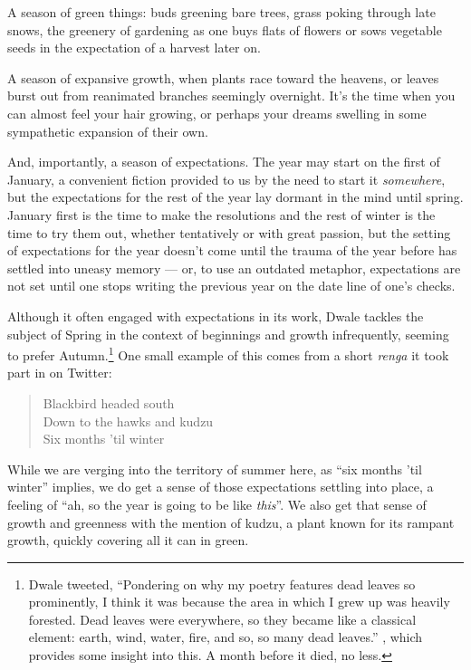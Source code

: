 \documentclass[12pt,oneside]{memoir}
\begin{document}
A season of green things: buds greening bare trees, grass poking through late snows, the greenery of gardening as one buys flats of flowers or sows vegetable seeds in the expectation of a harvest later on.

A season of expansive growth, when plants race toward the heavens, or leaves burst out from reanimated branches seemingly overnight. It's the time when you can almost feel your hair growing, or perhaps your dreams swelling in some sympathetic expansion of their own.

And, importantly, a season of expectations. The year may start on the first of January, a convenient fiction provided to us by the need to start it \emph{somewhere}, but the expectations for the rest of the year lay dormant in the mind until spring. January first is the time to make the resolutions and the rest of winter is the time to try them out, whether tentatively or with great passion, but the setting of expectations for the year doesn't come until the trauma of the year before has settled into uneasy memory --- or, to use an outdated metaphor, expectations are not set until one stops writing the previous year on the date line of one's checks.

Although it often engaged with expectations in its work, Dwale tackles the subject of Spring in the context of beginnings and growth infrequently, seeming to prefer Autumn.\footnote{Dwale tweeted, ``Pondering on why my poetry features dead leaves so prominently, I think it was because the area in which I grew up was heavily forested. Dead leaves were everywhere, so they became like a classical element: earth, wind, water, fire, and so, so many dead leaves.'' \parencite{dwale_leaves_tweet}, which provides some insight into this. A month before it died, no less.} One small example of this comes from a short \emph{renga} it took part in on Twitter:

\begin{verse}
Blackbird headed south\\
Down to the hawks and kudzu\\
Six months 'til winter

\parencite{dwale_haiku}
\end{verse}

While we are verging into the territory of summer here, as ``six months 'til winter'' implies, we do get a sense of those expectations settling into place, a feeling of ``ah, so the year is going to be like \emph{this}''. We also get that sense of growth and greenness with the mention of kudzu, a plant known for its rampant growth, quickly covering all it can in green.
\end{document}
